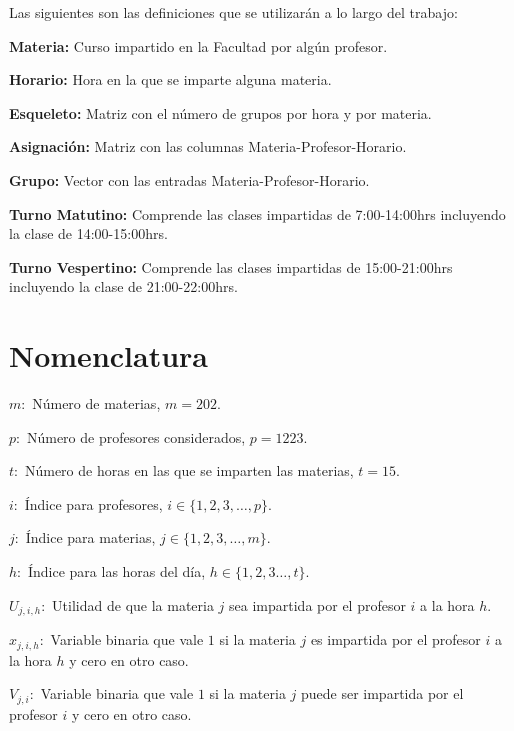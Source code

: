 Las siguientes son las definiciones que se utilizarán a lo largo del trabajo:
  
\textbf{Materia:} Curso impartido en la Facultad por algún profesor.

\textbf{Horario:} Hora en la que se imparte alguna materia.

\textbf{Esqueleto:} Matriz con el número de grupos por hora y por materia.

\textbf{Asignación:} Matriz con las columnas Materia-Profesor-Horario.

\textbf{Grupo:} Vector con las entradas Materia-Profesor-Horario.

\textbf{Turno Matutino:} Comprende las clases impartidas de 7:00-14:00hrs incluyendo la clase de 14:00-15:00hrs.

\textbf{Turno Vespertino:} Comprende las clases impartidas de 15:00-21:00hrs incluyendo la clase de 21:00-22:00hrs.


\section{Nomenclatura}

$m:$ Número de materias, $m = 202$.
  
  $p:$ Número de profesores considerados, $p = 1223$.
  
  $t:$ Número de horas en las que se imparten las materias, $t = 15$.
  
  $i:$ Índice para profesores, $i \in \{ 1, 2, 3, \ldots, p \}$.
  
  $j:$ Índice para materias, $j \in \{ 1, 2, 3, \ldots, m \}$.
  
  $h:$ Índice para las horas del día, $h \in \{ 1, 2, 3 \ldots, t\}$.
  
  $U_{j,i,h}:$ Utilidad de que la materia $j$ sea impartida por  el profesor $i$ a la hora $h$.
  
  $x_{j,i,h}:$ Variable binaria que vale $1$ si la materia $j$ es impartida por el profesor $i$ a la hora $h$ y cero en otro caso.

$V_{j,i}:$ Variable binaria que vale $1$ si la materia $j$ puede ser impartida por  el profesor $i$ y cero en otro caso.


%


